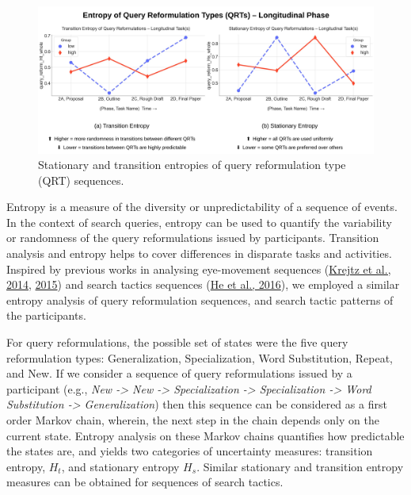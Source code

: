 \documentclass[letterpaper, nobind]{templates/ociamthesis}
\begin{document}
\begin{figure}

{\centering \includegraphics[width=1\linewidth]{figs/rp2-qrt-entropy} 

}

\caption[Entropy of Query Reformulation Types for the Longitudinal Phase.]{Stationary and transition entropies of query reformulation type (QRT) sequences.}\label{fig:rp2-qrt-entropy}
\end{figure}





Entropy is a measure of the diversity or unpredictability of a sequence of events. In the context of search queries, entropy can be used to quantify the variability or randomness of the query reformulations issued by participants.
Transition analysis and entropy helps to cover differences in disparate tasks and activities.
Inspired by previous works in analysing eye-movement sequences (\protect\hyperlink{ref-krejtz2014entropy}{Krejtz et al., 2014}, \protect\hyperlink{ref-krejtz2015gaze}{2015}) and search tactics sequences (\protect\hyperlink{ref-he2016beyond}{He et al., 2016}), we employed a similar entropy analysis of query reformulation sequences, and search tactic patterns of the participants.

For query reformulations, the possible set of states were the five query reformulation types:
Generalization, Specialization, Word Substitution, Repeat, and New.
If we consider a sequence of query reformulations issued by a participant
(e.g., \emph{New -\textgreater{} New -\textgreater{} Specialization -\textgreater{} Specialization -\textgreater{} Word Substitution -\textgreater{} Generalization})
then this sequence can be considered as a first order Markov chain, wherein, the next step in the chain depends only on the current state.
Entropy analysis on these Markov chains quantifies how predictable the states are, and yields two categories of uncertainty measures: transition entropy, \(H_t\), and stationary entropy \(H_s\).
Similar stationary and transition entropy measures can be obtained for sequences of search tactics.
\end{document}
